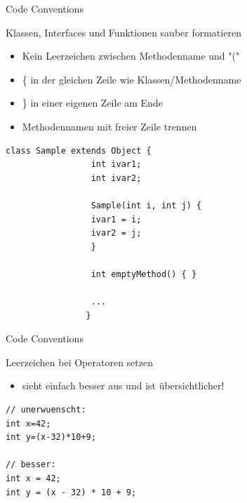 \documentclass[18pt]{beamer}
\begin{document}
\begin{frame}[fragile]{Code Conventions}
        \begin{block}{Klassen, Interfaces und Funktionen sauber formatieren}
                \begin{itemize}
                        \item Kein Leerzeichen zwischen Methodenname und "("
                        \item \{ in der gleichen Zeile wie Klassen/Methodenname
                        \item \} in einer eigenen Zeile am Ende
                        \item Methodennamen mit freier Zeile trennen
                \end{itemize}
                \begin{lstlisting}[basicstyle=\scriptsize]
                class Sample extends Object {
                 int ivar1;
                 int ivar2;
                
                 Sample(int i, int j) {
                 ivar1 = i;
                 ivar2 = j;
                 }
                
                 int emptyMethod() { }
                
                 ...
                }
                \end{lstlisting}
        \end{block}
\end{frame}

\begin{frame}[fragile]{Code Conventions}
        \begin{block}{Leerzeichen bei Operatoren setzen}
         \begin{itemize}
         \item sieht einfach besser aus und ist übersichtlicher!
         \end{itemize}
                \begin{lstlisting}[basicstyle=\scriptsize]
// unerwuenscht:
int x=42;
int y=(x-32)*10+9;
                
// besser:
int x = 42;
int y = (x - 32) * 10 + 9;
                \end{lstlisting}
        \end{block}
\end{frame}
\end{document}
